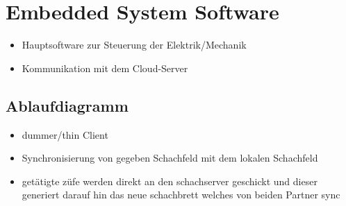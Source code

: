 \hypertarget{embedded-system-software}{%
\section{Embedded System Software}\label{embedded-system-software}}

\begin{itemize}
\tightlist
\item
  Hauptsoftware zur Steuerung der Elektrik/Mechanik
\item
  Kommunikation mit dem Cloud-Server
\end{itemize}

\hypertarget{ablaufdiagramm}{%
\subsection{Ablaufdiagramm}\label{ablaufdiagramm}}

\begin{itemize}
\tightlist
\item
  dummer/thin Client
\item
  Synchronisierung von gegeben Schachfeld mit dem lokalen Schachfeld
\item
  getätigte züfe werden direkt an den schachserver geschickt und dieser
  generiert darauf hin das neue schachbrett welches von beiden Partner
  sync
\end{itemize}

